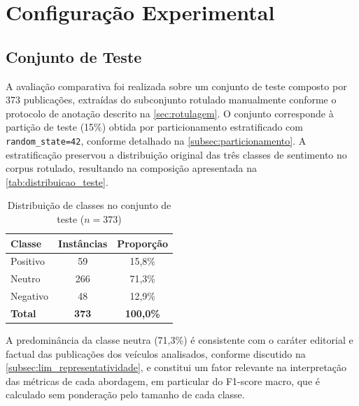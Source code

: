 
\section{Configuração Experimental}
\label{sec:config_experimental}

\subsection{Conjunto de Teste}
\label{subsec:conjunto_teste}

A avaliação comparativa foi realizada sobre um conjunto de teste composto por 373 publicações, extraídas do subconjunto rotulado manualmente conforme o protocolo de anotação descrito na \autoref{sec:rotulagem}. O conjunto corresponde à partição de teste (15\%) obtida por particionamento estratificado com \texttt{random\_state=42}, conforme detalhado na \autoref{subsec:particionamento}. A estratificação preservou a distribuição original das três classes de sentimento no corpus rotulado, resultando na composição apresentada na \autoref{tab:distribuicao_teste}.

\begin{table}[!htbp]
	\caption[Distribuição de classes no conjunto de teste]{Distribuição de classes no conjunto de teste ($n = 373$)}
	\label{tab:distribuicao_teste}
	\centering
	\begin{tabular}{lcc}
		\hline
		\textbf{Classe} & \textbf{Instâncias} & \textbf{Proporção} \\
		\hline
		Positivo  & 59  & 15,8\% \\
		\hline
		Neutro    & 266 & 71,3\% \\
		\hline
		Negativo  & 48  & 12,9\% \\
		\hline
		\textbf{Total} & \textbf{373} & \textbf{100,0\%} \\
		\hline
	\end{tabular}
\end{table}

A predominância da classe neutra (71,3\%) é consistente com o caráter editorial e factual das publicações dos veículos analisados, conforme discutido na \autoref{subsec:lim_representatividade}, e constitui um fator relevante na interpretação das métricas de cada abordagem, em particular do F1-score macro, que é calculado sem ponderação pelo tamanho de cada classe.

